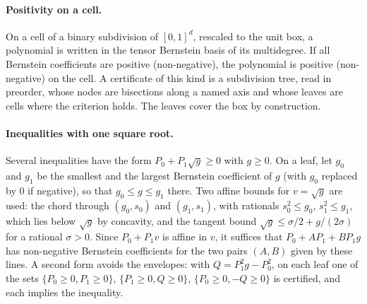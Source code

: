 \documentclass[aip,jmp,amsmath,amssymb,reprint]{revtex4-2}
\theoremstyle{plain}
\theoremstyle{definition}
\begin{document}
\paragraph{Positivity on a cell.} On a cell of a binary subdivision of $[0,1]^d$, rescaled to the unit box,
a polynomial is written in the tensor Bernstein basis of its multidegree. If all Bernstein coefficients are
positive (non-negative), the polynomial is positive (non-negative) on the cell. A certificate of this kind
is a subdivision tree, read in preorder, whose nodes are bisections along a named axis and whose leaves
are cells where the criterion holds. The leaves cover the box by construction.

\paragraph{Inequalities with one square root.} Several inequalities have the form $P_0+P_1\sqrt g\ge0$ with $g\ge0$.
On a leaf, let $g_0$ and $g_1$ be the smallest and the largest Bernstein coefficient of $g$ (with $g_0$
replaced by $0$ if negative), so that $g_0\le g\le g_1$ there. Two affine bounds for $v=\sqrt g$ are used:
the chord through $(g_0,s_0)$ and $(g_1,s_1)$, with rationals $s_0^2\le g_0$, $s_1^2\le g_1$, which lies below
$\sqrt g$ by concavity, and the tangent bound $\sqrt g\le\sigma/2+g/(2\sigma)$ for a rational $\sigma>0$. Since
$P_0+P_1v$ is affine in $v$, it suffices that $P_0+AP_1+BP_1g$ has non-negative Bernstein coefficients for
the two pairs $(A,B)$ given by these lines. A second form avoids the envelopes: with
$Q=P_1^2g-P_0^2$, on each leaf one of the sets $\{P_0\ge0,P_1\ge0\}$, $\{P_1\ge0,Q\ge0\}$, $\{P_0\ge0,-Q\ge0\}$ is
certified, and each implies the inequality.
\end{document}
